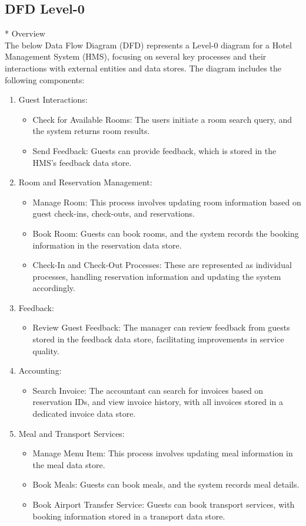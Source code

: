 \subsection{DFD Level-0}
* Overview \\
The below Data Flow Diagram (DFD) represents a Level-0 diagram for a Hotel Management System (HMS), focusing on several key processes and their interactions with external entities and data stores. The diagram includes the following components:
\begin{enumerate}
    \item Guest Interactions:
    \begin{itemize}
        \item Check for Available Rooms: The users initiate a room search query, and the system returns room results.
        \item Send Feedback: Guests can provide feedback, which is stored in the HMS's feedback data store.
    \end{itemize}
    \item Room and Reservation Management:
    \begin{itemize}
        \item Manage Room: This process involves updating room information based on guest check-ins, check-outs, and reservations.
        \item Book Room: Guests can book rooms, and the system records the booking information in the reservation data store.
        \item Check-In and Check-Out Processes: These are represented as individual processes, handling reservation information and updating the system accordingly.
    \end{itemize}
    \item Feedback:
    \begin{itemize}
        \item Review Guest Feedback: The manager can review feedback from guests stored in the feedback data store, facilitating improvements in service quality.
    \end{itemize}
    \item Accounting:
    \begin{itemize}
        \item Search Invoice: The accountant can search for invoices based on reservation IDs, and view invoice history, with all invoices stored in a dedicated invoice data store.
    \end{itemize}
    \item Meal and Transport Services:
    \begin{itemize}
        \item Manage Menu Item: This process involves updating meal information in the meal data store.
        \item Book Meals: Guests can book meals, and the system records meal details.
        \item Book Airport Transfer Service: Guests can book transport services, with booking information stored in a transport data store.
    \end{itemize}
\end{enumerate}
